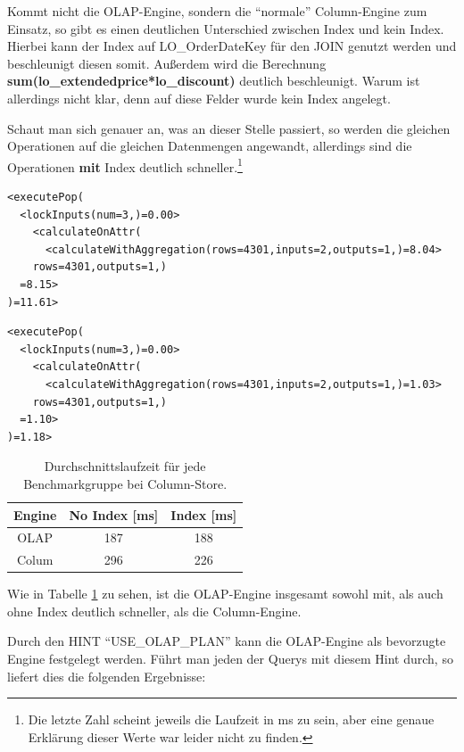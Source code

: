 Kommt nicht die OLAP-Engine, sondern die \enquote{normale} Column-Engine zum Einsatz, so gibt es einen deutlichen Unterschied zwischen Index und kein Index. Hierbei kann der Index auf LO\_OrderDateKey für den JOIN genutzt werden und beschleunigt diesen somit.
Außerdem wird die Berechnung \textbf{sum(lo\_extendedprice*lo\_discount)} deutlich beschleunigt. Warum ist allerdings nicht klar, denn auf diese Felder wurde kein Index angelegt.


Schaut man sich genauer an, was an dieser Stelle passiert, so werden die gleichen Operationen auf die gleichen Datenmengen angewandt, allerdings sind die Operationen \textbf{mit} Index deutlich schneller.\footnote{Die letzte Zahl scheint jeweils die Laufzeit in ms zu sein, aber eine genaue Erklärung dieser Werte war leider nicht zu finden.}
\begin{lstlisting}[breaklines, caption=Ohne Index]
<executePop(
  <lockInputs(num=3,)=0.00>
    <calculateOnAttr(
      <calculateWithAggregation(rows=4301,inputs=2,outputs=1,)=8.04>
    rows=4301,outputs=1,)
  =8.15>
)=11.61>
\end{lstlisting}

\begin{lstlisting}[breaklines, caption=Mit Index]
<executePop(
  <lockInputs(num=3,)=0.00>
    <calculateOnAttr(
      <calculateWithAggregation(rows=4301,inputs=2,outputs=1,)=1.03>
    rows=4301,outputs=1,)
  =1.10>
)=1.18>
\end{lstlisting}

\begin{table}
    \begin{tabular}{ccc}
        \toprule
        Engine              & No Index [ms]   & Index [ms] \\
        \toprule
        OLAP                & 187        & 188            \\
        Colum               & 296        & 226            \\   
        \bottomrule
    \end{tabular}
	\caption{Durchschnittslaufzeit für jede Benchmarkgruppe bei Column-Store.}
    \label{tab:olap}
\end{table}


Wie in Tabelle \ref{tab:olap} zu sehen, ist die OLAP-Engine insgesamt sowohl mit, als auch ohne Index deutlich schneller, als die Column-Engine. 

Durch den HINT \enquote{USE\_OLAP\_PLAN} kann die OLAP-Engine als bevorzugte Engine festgelegt werden. Führt man jeden der Querys mit diesem Hint durch, so liefert dies die folgenden Ergebnisse:

